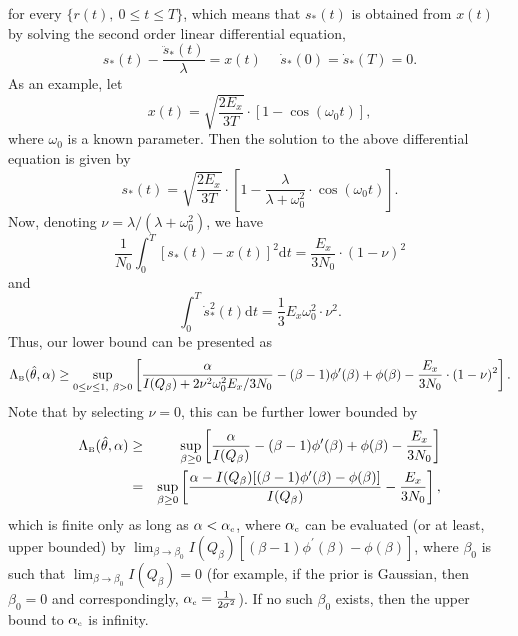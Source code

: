 \documentclass[11pt,epsf]{article}
\newcommand{\ct}{\hat{\theta}}
\begin{document}
for every $\{r(t),~0\le t\le T\}$,
which means that $s_*(t)$ is obtained from $x(t)$ by solving the second order
linear differential equation,
\begin{equation}
s_*(t)-\frac{\ddot{s}_*(t)}{\lambda}=x(t)~~~~~~\dot{s}_*(0)=\dot{s}_*(T)=0.
\end{equation}
As an example, let
\begin{equation}
x(t)=\sqrt{\frac{2E_x}{3T}}\cdot[1-\cos(\omega_0 t)],
\end{equation}
where $\omega_0$ is a known parameter.
Then the solution to the above differential equation is
given by
\begin{equation}
s_*(t)=\sqrt{\frac{2E_x}{3T}}\cdot\left[1-\frac{\lambda}{\lambda+\omega_0^2}\cdot\cos(\omega_0
t)\right].
\end{equation}
Now, denoting $\nu=\lambda/{(\lambda+\omega_0^2)}$, we have
\begin{equation}
\frac{1}{N_0}\int_0^T[s_*(t)-x(t)]^2\mbox{d}t
=\frac{E_x}{3N_0}\cdot(1-\nu)^2
\end{equation}
and 
\begin{equation}
\int_0^T\dot{s}_*^2(t)\mbox{d}t=\frac{1}{3}E_x\omega_0^2\cdot\nu^2.
\end{equation}
Thus, our lower bound can be presented as
\begin{equation}
\Lambda_{\mbox{\tiny B}}(\ct,\alpha)\ge
\sup_{0\le\nu\le 1,~\beta> 0}\left[\frac{\alpha}
{I(Q_\beta)+2\nu^2\omega_0^2E_x/3N_0}
-(\beta-1)\phi^\prime(\beta)+\phi(\beta)-\frac{E_x}{3N_0}\cdot(1-\nu)^2\right].
\end{equation}
Note that by selecting $\nu=0$, this can be further lower bounded by
\begin{eqnarray}
\Lambda_{\mbox{\tiny B}}(\ct,\alpha)&\ge&
\sup_{\beta\ge 0}\left[\frac{\alpha}
{I(Q_\beta)}
-(\beta-1)\phi^\prime(\beta)+\phi(\beta)-\frac{E_x}{3N_0}\right]\\
&=&\sup_{\beta\ge
0}\left[\frac{\alpha-I(Q_\beta)[(\beta-1)\phi^\prime(\beta)-\phi(\beta)]}
{I(Q_\beta)}
-\frac{E_x}{3N_0}\right],
\end{eqnarray}
which is finite only as long as $\alpha < \alpha_{\mbox{\tiny c}}$, 
where $\alpha_{\mbox{\tiny c}}$ can be evaluated (or at least,
upper bounded) by $\lim_{\beta\to
\beta_0}I(Q_\beta)[(\beta-1)\phi^\prime(\beta)-\phi(\beta)]$,
where $\beta_0$ is such that $\lim_{\beta\to\beta_0} I(Q_\beta)=0$
(for example, if the prior is Gaussian, then $\beta_0=0$ and correspondingly,
$\alpha_{\mbox{\tiny c}}=\frac{1}{2\sigma^2}$).
If no such $\beta_0$ exists, 
then the upper bound to $\alpha_{\mbox{\tiny c}}$ is infinity. 
\end{document}
